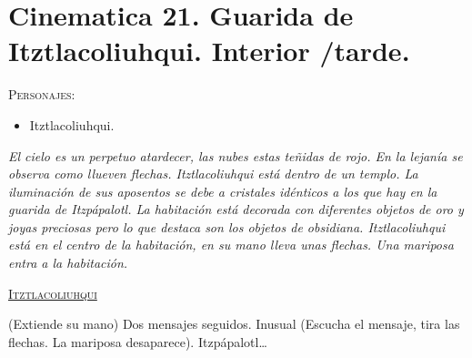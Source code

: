 \section{Cinematica 21. Guarida de Itztlacoliuhqui. Interior /tarde.}  \label{Cin:Cinematica20}
\textsc{Personajes}:
\begin{itemize}
\item Itztlacoliuhqui. 
\end{itemize}
\textit{El cielo es un perpetuo atardecer, las nubes estas teñidas de rojo. En la lejanía se observa como llueven flechas. Itztlacoliuhqui está dentro de un templo. La iluminación de sus aposentos se debe a cristales idénticos a los que hay en la guarida de Itzpápalotl. La habitación está decorada con diferentes objetos de oro y joyas preciosas pero lo que destaca son los objetos de obsidiana. Itztlacoliuhqui está en el centro de la habitación, en su mano lleva unas flechas. Una mariposa entra a la habitación.}
\begin{center}
\textsc{\underline{Itztlacoliuhqui}}
\\
\par
(Extiende su mano) Dos mensajes seguidos. Inusual (Escucha el mensaje, tira las flechas. La mariposa desaparece).  Itzpápalotl…
\end{center}
